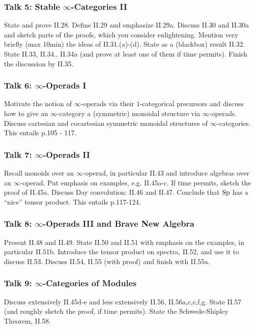 \documentclass{article}
\begin{document}
\subsubsection*{Talk 5: Stable $\infty$-Categories II}
State and prove II.28. Define II.29 and emphasize II.29a.
Discuss II.30 and II.30a and sketch parts of the proofs, which you consider
enlightening. Mention very briefly (max 10min) the ideas of II.31.(a)-(d).
State as a (blackbox) result II.32. State II.33, II.34., II.34a 
(and prove at least one of them if time permits).
Finish the discussion by II.35.

\subsubsection*{Talk 6: $\infty$-Operads I}
Motivate the notion of $\infty$-operads via their $1$-categorical 
precursors and discuss how to give an $\infty$-category a 
(symmetric) monoidal structure via $\infty$-operads. Discuss 
cartesian and cocartesian symmetric monoidal structures of
$\infty$-categories. This entails p.105 - 117.

\subsubsection*{Talk 7: $\infty$-Operads II}
Recall monoids over an $\infty$-operad, in particular II.43 and 
introduce algebras over an $\infty$-operad.
Put emphasis on examples, e.g. II.45a-c.
If time permits, sketch the proof of II.45a.
Discuss Day convolution: II.46 and II.47.
Conclude that $\mathrm{Sp}$ has a \enquote{nice} tensor product.
This entails p.117-124.

\subsubsection*{Talk 8: $\infty$-Operads III and Brave New Algebra}
Present II.48 and II.49. State II.50 and II.51 with emphasis on 
the examples, in particular II.51b. Introduce the tensor product on
spectra, II.52, and use it to discuss II.53. Discuss II.54, II.55 (with proof)
and finish with II.55a.

\subsubsection*{Talk 9: $\infty$-Categories of Modules}
Discuss extensively II.45d-e and less extensively II.56, II.56a,c,e,f,g.
State II.57 (and roughly sketch the proof, if time permits).
State the Schwede-Shipley Theorem, II.58.
\end{document}
